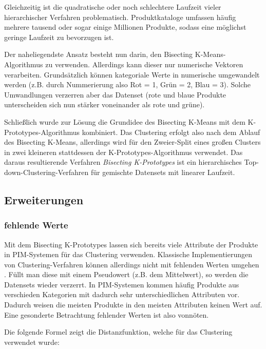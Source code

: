 Gleichzeitig ist die quadratische oder noch schlechtere Laufzeit vieler
hierarchischer Verfahren problematisch. Produktkataloge umfassen häufig
mehrere tausend oder sogar einige Millionen Produkte, sodass eine
möglichst geringe Laufzeit zu bevorzugen ist.

Der naheliegendste Ansatz besteht nun darin, den Bisecting
K-Means-Algorithmus zu verwenden. Allerdings kann dieser nur numerische
Vektoren verarbeiten. Grundsätzlich können kategoriale Werte in
numerische umgewandelt werden (z.B. durch Nummerierung also Rot = 1,
Grün = 2, Blau = 3). Solche Umwandlungen verzerren aber das Datenset
(rote und blaue Produkte unterscheiden sich nun stärker voneinander als
rote und grüne). \autocite[Kap. 1.2.6 Mixed Variables]{kaufman2009}

Schließlich wurde zur Lösung die Grundidee des Bisecting K-Means mit dem
K-Prototypes-Algorithmus kombiniert. Das Clustering erfolgt also nach
dem Ablauf des Bisecting K-Means, allerdings wird für den Zweier-Split
eines großen Clusters in zwei kleineren stattdessen der
K-Prototypes-Algorithmus verwendet. Das daraus resultierende Verfahren
\emph{Bisecting K-Prototypes} ist ein hierarchisches
Top-down-Clustering-Verfahren für gemischte Datensets mit linearer
Laufzeit.

\hypertarget{erweiterungen}{%
\subsection{Erweiterungen}\label{erweiterungen}}

\hypertarget{fehlende-werte}{%
\subsubsection{fehlende Werte}\label{fehlende-werte}}

Mit dem Bisecting K-Prototypes lassen sich bereits viele Attribute der
Produkte in PIM-Systemen für das Clustering verwenden. Klassische
Implementierungen von Clustering-Verfahren können allerdings nicht mit
fehlenden Werten umgehen \autocite[siehe z.B.][]{sklearn2022}. Füllt man
diese mit einem Pseudowert (z.B. dem Mittelwert), so werden die
Datensets wieder verzerrt. In PIM-Systemen kommen häufig Produkte aus
verschieden Kategorien mit dadurch sehr unterschiedlichen Attributen
vor. Dadurch weisen die meisten Produkte in den meisten Attributen
keinen Wert auf. Eine gesonderte Betrachtung fehlender Werten ist also
vonnöten.

Die folgende Formel zeigt die Distanzfunktion, welche für das Clustering
verwendet wurde:

